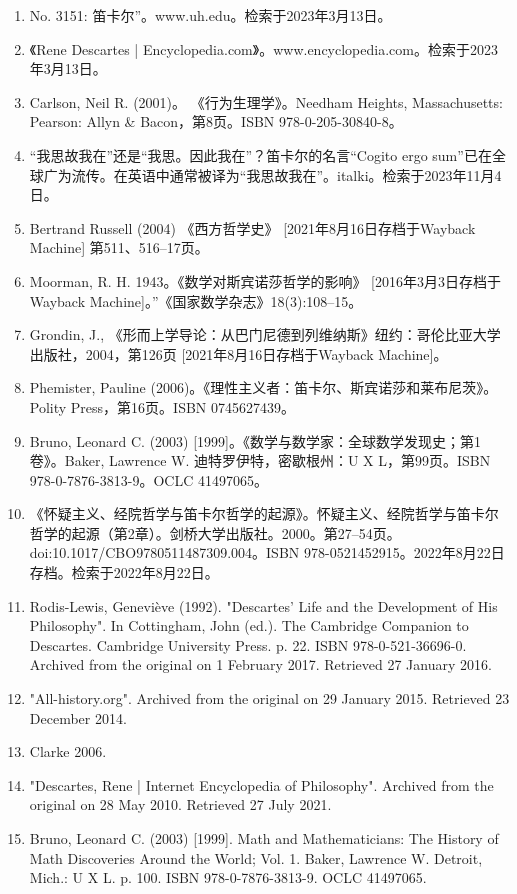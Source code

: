 \begin{enumerate}
\item No. 3151: 笛卡尔”。www.uh.edu。检索于2023年3月13日。  
\item 《Rene Descartes | Encyclopedia.com》。www.encyclopedia.com。检索于2023年3月13日。  
\item Carlson, Neil R. (2001)。 《行为生理学》。Needham Heights, Massachusetts: Pearson: Allyn & Bacon，第8页。ISBN 978-0-205-30840-8。  
\item “我思故我在”还是“我思。因此我在”？笛卡尔的名言“Cogito ergo sum”已在全球广为流传。在英语中通常被译为“我思故我在”。italki。检索于2023年11月4日。  
\item Bertrand Russell (2004) 《西方哲学史》 [2021年8月16日存档于Wayback Machine] 第511、516–17页。
\item Moorman, R. H. 1943。《数学对斯宾诺莎哲学的影响》 [2016年3月3日存档于Wayback Machine]。”《国家数学杂志》18(3):108–15。  
\item Grondin, J., 《形而上学导论：从巴门尼德到列维纳斯》纽约：哥伦比亚大学出版社，2004，第126页 [2021年8月16日存档于Wayback Machine]。  
\item Phemister, Pauline (2006)。《理性主义者：笛卡尔、斯宾诺莎和莱布尼茨》。Polity Press，第16页。ISBN 0745627439。  
\item Bruno, Leonard C. (2003) [1999]。《数学与数学家：全球数学发现史；第1卷》。Baker, Lawrence W. 迪特罗伊特，密歇根州：U X L，第99页。ISBN 978-0-7876-3813-9。OCLC 41497065。  
\item 《怀疑主义、经院哲学与笛卡尔哲学的起源》。怀疑主义、经院哲学与笛卡尔哲学的起源（第2章）。剑桥大学出版社。2000。第27–54页。doi:10.1017/CBO9780511487309.004。ISBN 978-0521452915。2022年8月22日存档。检索于2022年8月22日。
\item Rodis-Lewis, Geneviève (1992). "Descartes' Life and the Development of His Philosophy". In Cottingham, John (ed.). The Cambridge Companion to Descartes. Cambridge University Press. p. 22. ISBN 978-0-521-36696-0. Archived from the original on 1 February 2017. Retrieved 27 January 2016.\item "All-history.org". Archived from the original on 29 January 2015. Retrieved 23 December 2014.
\item Clarke 2006.
\item "Descartes, Rene | Internet Encyclopedia of Philosophy". Archived from the original on 28 May 2010. Retrieved 27 July 2021.
\item Bruno, Leonard C. (2003) [1999]. Math and Mathematicians: The History of Math Discoveries Around the World; Vol. 1. Baker, Lawrence W. Detroit, Mich.: U X L. p. 100. ISBN 978-0-7876-3813-9. OCLC 41497065.

\end{enumerate}
